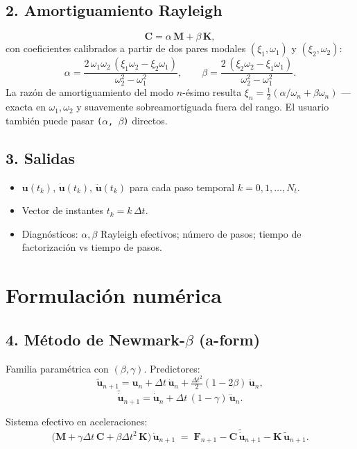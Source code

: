 \documentclass[11pt,letterpaper,oneside]{report}
\begin{document}
\subsection{2. Amortiguamiento Rayleigh}
\[
\mathbf C = \alpha\,\mathbf M + \beta\,\mathbf K,
\]
con coeficientes calibrados a partir de dos pares modales $(\xi_1, \omega_1)$ y $(\xi_2, \omega_2)$:
\[
\alpha = \frac{2\,\omega_1\omega_2\,(\xi_1\omega_2 - \xi_2\omega_1)}{\omega_2^2 - \omega_1^2}, \qquad
  \beta = \frac{2\,(\xi_2\omega_2 - \xi_1\omega_1)}{\omega_2^2 - \omega_1^2}.
\]
La razón de amortiguamiento del modo $n$-ésimo resulta $\xi_n = \tfrac{1}{2}(\alpha/\omega_n + \beta\omega_n)$ --- exacta en $\omega_1, \omega_2$ y suavemente sobreamortiguada fuera del rango. El usuario también puede pasar \texttt{(\ensuremath{\alpha}, \ensuremath{\beta})} directos.

\subsection{3. Salidas}
\begin{itemize}
  \item $\mathbf u(t_k)$, $\dot{\mathbf u}(t_k)$, $\ddot{\mathbf u}(t_k)$ para cada paso temporal $k = 0, 1, \ldots, N_t$.
  \item Vector de instantes $t_k = k\,\Delta t$.
  \item Diagnósticos: $\alpha, \beta$ Rayleigh efectivos; número de pasos; tiempo de factorización vs tiempo de pasos.
\end{itemize}


\section{Formulación numérica}

\subsection{4. Método de Newmark-\ensuremath{\beta} (a-form)}
Familia paramétrica con $(\beta, \gamma)$. Predictores:
\[
\tilde{\mathbf u}_{n+1} = \mathbf u_n + \Delta t\,\dot{\mathbf u}_n + \tfrac{\Delta t^2}{2}(1 - 2\beta)\,\ddot{\mathbf u}_n,
\]
\[
\tilde{\dot{\mathbf u}}_{n+1} = \dot{\mathbf u}_n + \Delta t\,(1 - \gamma)\,\ddot{\mathbf u}_n.
\]

Sistema efectivo en aceleraciones:
\[
\bigl(\mathbf M + \gamma\Delta t\,\mathbf C + \beta\Delta t^2\,\mathbf K\bigr)\,\ddot{\mathbf u}_{n+1} \;=\; \mathbf F_{n+1} - \mathbf C\,\tilde{\dot{\mathbf u}}_{n+1} - \mathbf K\,\tilde{\mathbf u}_{n+1}.
\]
\end{document}
